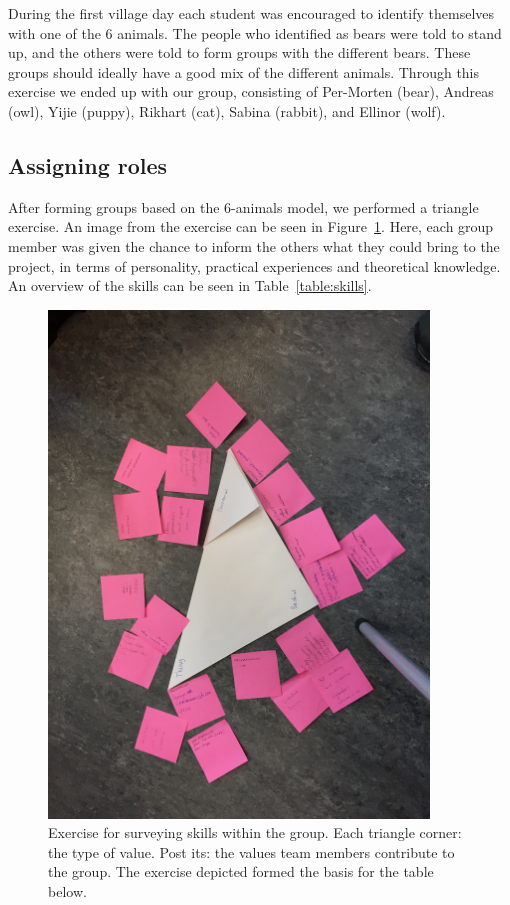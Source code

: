 During the first village day each student was encouraged to identify themselves with one of the 6 animals. The people who identified as bears were told to stand up, and the others were told to form groups with the different bears. These groups should ideally have a good mix of the different animals. Through this exercise we ended up with our group, consisting of
Per-Morten (bear), Andreas (owl), Yijie (puppy), Rikhart (cat), Sabina (rabbit), and Ellinor (wolf). 


\subsection{Assigning roles} \label{sec:assigning_roles}
After forming groups based on the 6-animals model, we performed a triangle exercise. An image from the exercise can be seen in Figure~\ref{fig:triangle_exercise}. Here, each group member was given the chance to inform the others what they could bring to the project, in terms of personality,  practical experiences and theoretical knowledge. An overview of the skills can be seen in Table~\ref{table:skills}.

\begin{figure}[h]
    \centering
    \includegraphics[width=0.9\textwidth]{images/triangle_exercise}
    \caption[Exercise for surveying skills within the group.]{Exercise for surveying skills within the group. Each triangle corner: the type of value. Post its: the values team members contribute to the group. The exercise depicted formed the basis for the table below.}
    \label{fig:triangle_exercise}
\end{figure}

